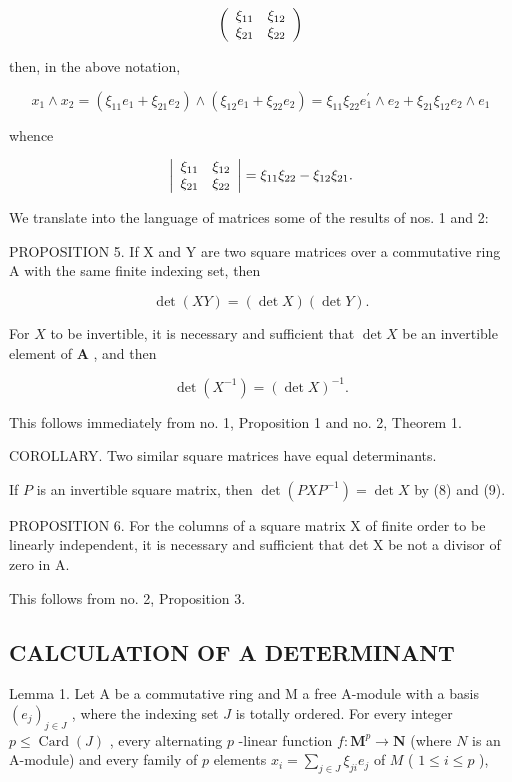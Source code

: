 \[
\left( \begin{array}{c c} \xi_ {1 1} & \xi_ {1 2} \\ \xi_ {2 1} & \xi_ {2 2} \end{array} \right)
\]

then, in the above notation,

\[
x _ {1} \wedge x _ {2} = (\xi_ {1 1} e _ {1} + \xi_ {2 1} e _ {2}) \wedge (\xi_ {1 2} e _ {1} + \xi_ {2 2} e _ {2}) = \xi_ {1 1} \xi_ {2 2} e _ {1} ^ {\prime} \wedge e _ {2} + \xi_ {2 1} \xi_ {1 2} e _ {2} \wedge e _ {1}
\]

whence

\[
\left| \begin{array}{c c} \xi_ {1 1} & \xi_ {1 2} \\ \xi_ {2 1} & \xi_ {2 2} \end{array} \right| = \xi_ {1 1} \xi_ {2 2} - \xi_ {1 2} \xi_ {2 1}.
\]

We translate into the language of matrices some of the results of nos. 1 and 2:

PROPOSITION 5. If X and Y are two square matrices over a commutative ring A with the same finite indexing set, then

\[
\det (X Y) = (\det X) (\det Y).\tag{8}
\]

For \(X\) to be invertible, it is necessary and sufficient that \(\det X\) be an invertible element of \(\mathbf{A}\) , and then

\[
\det (X ^ {- 1}) = (\det X) ^ {- 1}.\tag{9}
\]

This follows immediately from no. 1, Proposition 1 and no. 2, Theorem 1.

COROLLARY. Two similar square matrices have equal determinants.

If \(P\) is an invertible square matrix, then \(\det(PXP^{-1}) = \det X\) by (8) and (9).

PROPOSITION 6. For the columns of a square matrix X of finite order to be linearly independent, it is necessary and sufficient that det X be not a divisor of zero in A.

This follows from no. 2, Proposition 3.

\subsection{CALCULATION OF A DETERMINANT}

Lemma 1. Let A be a commutative ring and M a free A-module with a basis \((e_j)_{j \in J}\) , where the indexing set \(J\) is totally ordered. For every integer \(p \leqslant \operatorname{Card}(J)\) , every alternating \(p\) -linear function \(f: \mathbf{M}^p \to \mathbf{N}\) (where \(N\) is an A-module) and every family of \(p\) elements \(x_i = \sum_{j \in J} \xi_{ji} e_j\) of \(M\) ( \(1 \leqslant i \leqslant p\) ),

